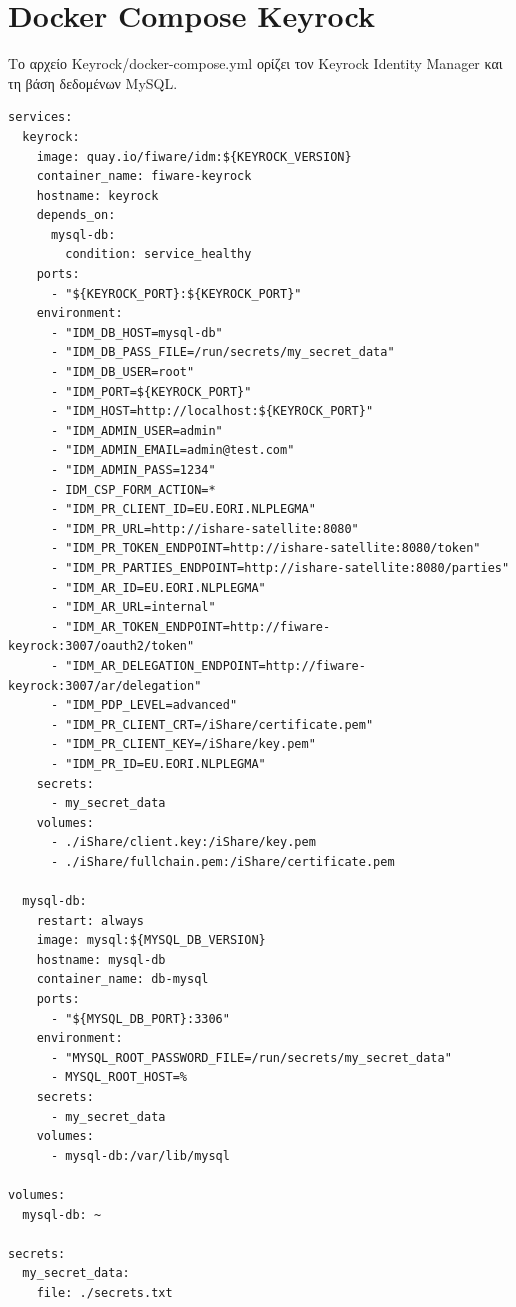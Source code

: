 \section{\textlatin{Docker Compose Keyrock}}
\label{app:docker-keyrock}

Το αρχείο \textlatin{Keyrock/docker-compose.yml} ορίζει τον
\textlatin{Keyrock Identity Manager} και τη βάση δεδομένων
\textlatin{MySQL}.

\begin{lstlisting}[language={},]
services:
  keyrock:
    image: quay.io/fiware/idm:${KEYROCK_VERSION}
    container_name: fiware-keyrock
    hostname: keyrock
    depends_on:
      mysql-db:
        condition: service_healthy
    ports:
      - "${KEYROCK_PORT}:${KEYROCK_PORT}"
    environment:
      - "IDM_DB_HOST=mysql-db"
      - "IDM_DB_PASS_FILE=/run/secrets/my_secret_data"
      - "IDM_DB_USER=root"
      - "IDM_PORT=${KEYROCK_PORT}"
      - "IDM_HOST=http://localhost:${KEYROCK_PORT}"
      - "IDM_ADMIN_USER=admin"
      - "IDM_ADMIN_EMAIL=admin@test.com"
      - "IDM_ADMIN_PASS=1234"
      - IDM_CSP_FORM_ACTION=*
      - "IDM_PR_CLIENT_ID=EU.EORI.NLPLEGMA"
      - "IDM_PR_URL=http://ishare-satellite:8080"
      - "IDM_PR_TOKEN_ENDPOINT=http://ishare-satellite:8080/token"
      - "IDM_PR_PARTIES_ENDPOINT=http://ishare-satellite:8080/parties"
      - "IDM_AR_ID=EU.EORI.NLPLEGMA"
      - "IDM_AR_URL=internal"
      - "IDM_AR_TOKEN_ENDPOINT=http://fiware-keyrock:3007/oauth2/token"
      - "IDM_AR_DELEGATION_ENDPOINT=http://fiware-keyrock:3007/ar/delegation"
      - "IDM_PDP_LEVEL=advanced"
      - "IDM_PR_CLIENT_CRT=/iShare/certificate.pem"
      - "IDM_PR_CLIENT_KEY=/iShare/key.pem"
      - "IDM_PR_ID=EU.EORI.NLPLEGMA"
    secrets:
      - my_secret_data
    volumes:
      - ./iShare/client.key:/iShare/key.pem
      - ./iShare/fullchain.pem:/iShare/certificate.pem

  mysql-db:
    restart: always
    image: mysql:${MYSQL_DB_VERSION}
    hostname: mysql-db
    container_name: db-mysql
    ports:
      - "${MYSQL_DB_PORT}:3306"
    environment:
      - "MYSQL_ROOT_PASSWORD_FILE=/run/secrets/my_secret_data"
      - MYSQL_ROOT_HOST=%
    secrets:
      - my_secret_data
    volumes:
      - mysql-db:/var/lib/mysql

volumes:
  mysql-db: ~

secrets:
  my_secret_data:
    file: ./secrets.txt
\end{lstlisting}


